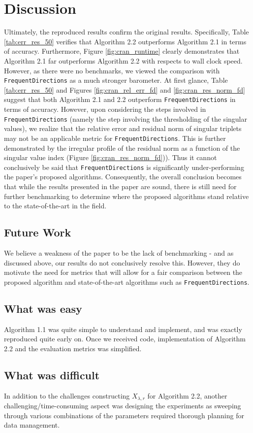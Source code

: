 \section{Discussion} \label{sec:discussion}

Ultimately, the reproduced results confirm the original results. Specifically, Table \ref{tab:err_res_50} verifies that Algorithm 2.2 outperforms Algorithm 2.1 in terms of accuracy. Furthermore, Figure \ref{fig:cran_runtime} clearly demonstrates that Algorithm 2.1 far outperforms Algorithm 2.2 with respects to wall clock speed. However, as there were no benchmarks, we viewed the comparison with \verb|FrequentDirections| as a much stronger barometer. At first glance, Table \ref{tab:err_res_50} and Figures \ref{fig:cran_rel_err_fd} and \ref{fig:cran_res_norm_fd} suggest that both Algorithm 2.1 and 2.2 outperform \verb|FrequentDirections| in terms of accuracy. However, upon considering the steps involved in \verb|FrequentDirections| (namely the step involving the thresholding of the singular values), we realize that the relative error and residual norm of singular triplets may not be an applicable metric for \verb|FrequentDirections|. This is further demonstrated by the irregular profile of the residual norm as a function of the singular value index (Figure \ref{fig:cran_res_norm_fd})). Thus it cannot conclusively be said that \verb|FrequentDirections| is significantly under-performing the paper's proposed algorithms. Consequently, the overall conclusion becomes that while the results presented in the paper are sound, there is still need for further benchmarking to determine where the proposed algorithms stand relative to the state-of-the-art in the field.

\subsection{Future Work}
We believe a weakness of the paper to be the lack of benchmarking - and as discussed above, our results do not conclusively resolve this. However, they do motivate the need for metrics that will allow for a fair comparison between the proposed algorithm and state-of-the-art algorithms such as \verb|FrequentDirections|.

\subsection{What was easy}

Algorithm 1.1 was quite simple to understand and implement, and was exactly reproduced quite early on. Once we received code, implementation of Algorithm 2.2 and the evaluation metrics was  simplified. 

\subsection{What was difficult}

In addition to the challenges constructing $X_{\lambda,r}$ for Algorithm 2.2, another challenging/time-consuming aspect was designing the experiments as sweeping through various combinations of the parameters required thorough planning for data management.
